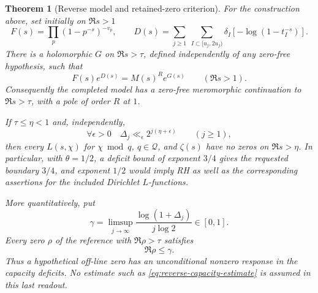 \documentclass[11pt]{article}
\newtheorem{theorem}{Theorem}[section]
\theoremstyle{definition}
\begin{document}
\begin{theorem}[Reverse model and retained-zero criterion]
\label{thm:reverse-prime-capacity}
For the construction above, set initially on $\Re s>1$
\[
 F(s)=\prod_p(1-p^{-s})^{-v_p},\qquad
 D(s)=\sum_{j\ge1}\ \sum_{I\subset[u_j,2u_j)}
                  \delta_I[-\log(1-t_I^{-s})].
\]
There is a holomorphic $G$ on $\Re s>\tau$, defined independently
of any zero-free hypothesis, such that
\begin{equation}
             F(s)e^{D(s)}=M(s)^R e^{G(s)}
                    \qquad(\Re s>1).
 \label{eq:reverse-completed-model}
\end{equation}
Consequently the completed model has a zero-free meromorphic
continuation to $\Re s>\tau$, with a pole of order $R$ at $1$.

If $\tau\le\eta<1$ and, independently,
\begin{equation}
 \forall\epsilon>0\quad
       \Delta_j\ll_\epsilon 2^{j(\eta+\epsilon)}
                    \qquad(j\ge1),
 \label{eq:reverse-capacity-estimate}
\end{equation}
then every $L(s,\chi)$ for $\chi\bmod q$, $q\in\mathcal Q$,
and $\zeta(s)$ have no zeros on $\Re s>\eta$.
In particular, with $\theta=1/2$, a deficit bound of exponent
$3/4$ gives the requested boundary $3/4$, and exponent $1/2$
would imply RH as well as the corresponding assertions for
the included Dirichlet $L$-functions.

More quantitatively, put
\[
 \gamma=\limsup_{j\to\infty}
              \frac{\log(1+\Delta_j)}{j\log2}\in[0,1].
\]
Every zero $\rho$ of the reference with $\Re\rho>\tau$ satisfies
\begin{equation}
                         \Re\rho\le\gamma.
 \label{eq:deficit-zero-readout}
\end{equation}
Thus a hypothetical off-line zero has an unconditional nonzero
response in the capacity deficits. No estimate such as
\eqref{eq:reverse-capacity-estimate} is assumed in this last readout.
\end{theorem}
\end{document}
